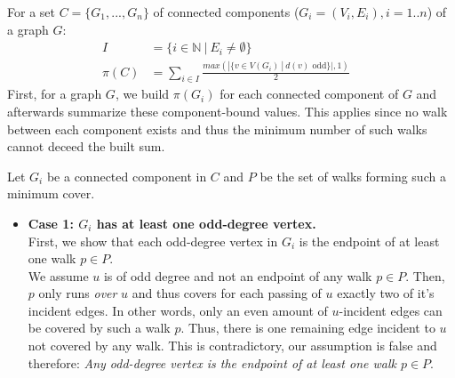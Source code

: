 \documentclass[a4paper]{article}
\begin{document}
	\begin{solution}{7}
		\begin{theorem}{
		For a set $C = \{G_1, ..., G_n\}$ of connected components ($G_i = (V_i, E_i), i = 1..n$) of a graph $G$:\\
		\begin{align}
			I&=\{i \in \mathbb{N}\ |\ E_i \neq \emptyset\}&\\
			\pi(C)&= \sum_{i \in I} \frac{max(|\{v \in V(G_i)\ |\ d(v) \text{ odd}\}|, 1)}{2}&
		\end{align}}			
			First, for a graph $G$, we build $\pi(G_i)$ for each connected component of $G$ and afterwards summarize these component-bound values. This applies since no walk between each component exists and thus the minimum number of such walks cannot deceed the built sum.

			Let $G_i$ be a connected component in $C$ and $P$ be the set of walks forming such a minimum cover.
			
			\begin{itemize}
				\item \textbf{Case 1: $G_i$ has at least one odd-degree vertex.}\\
					First, we show that each odd-degree vertex in $G_i$ is the endpoint of at least one walk $p \in P$.\\

					We assume $u$ is of odd degree and not an endpoint of any walk $p \in P$.
					Then, $p$ only runs \emph{over} $u$ and thus covers  for each passing of $u$ exactly two of it's incident edges.  In other words, only an even amount of $u$-incident edges can be covered by such a walk $p$.
					Thus, there is one remaining edge incident to $u$ not covered by any walk. This is contradictory, our assumption is false and therefore: \emph{Any odd-degree vertex is the endpoint of at least one walk $p \in P$}.\\
			

\end{itemize}
\end{theorem}
\end{solution}
\end{document}
